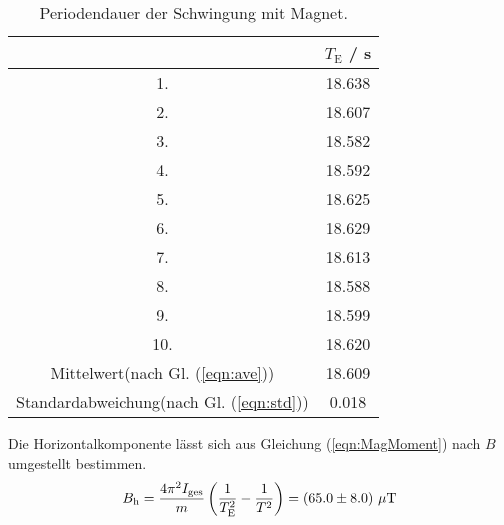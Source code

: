 \begin{table}[H] %
  \centering
  \begin{tabular}{c c}
    \toprule
    & $T_\text{E}$ / s \\
    \midrule
    1. & 18.638 \\
    2. & 18.607 \\
    3. & 18.582 \\
    4. & 18.592 \\
    5. & 18.625 \\
    6. & 18.629 \\
    7. & 18.613 \\
    8. & 18.588 \\
    9. & 18.599 \\
    10.& 18.620 \\
    \bottomrule
    Mittelwert(nach Gl. (\ref{eqn:ave})) & 18.609 \\
    Standardabweichung(nach Gl. (\ref{eqn:std})) & 0.018 \\
    \bottomrule
  \end{tabular}
  \caption{Periodendauer der Schwingung mit Magnet.}
  \label{tab:Periodendauer2}
\end{table}

Die Horizontalkomponente lässt sich aus Gleichung (\ref{eqn:MagMoment}) nach $B$ umgestellt bestimmen.
\begin{equation}
  B_\text{h} = \frac{4 \pi^2 I_\text{ges}}{m} \left(\frac{1}{T_\text{E}^2} - \frac{1}{T^2} \right) = (\num{65.0 +- 8.0}) \ \mu \text{T}
\end{equation}
